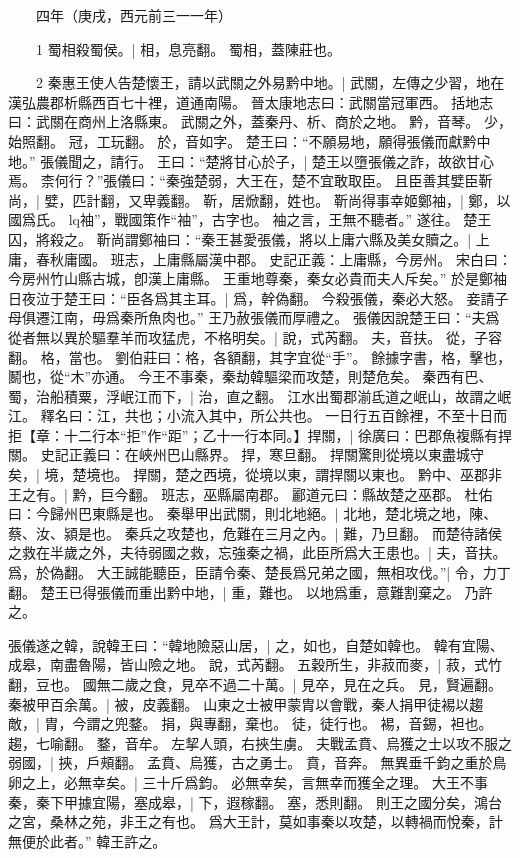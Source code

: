 　　四年（庚戌，西元前三一一年）

　　1 蜀相殺蜀侯。|{
	相，息亮翻。
	蜀相，蓋陳莊也。
}

　　2 秦惠王使人告楚懷王，請以武關之外易黔中地。|{
	武關，左傳之少習，地在漢弘農郡析縣西百七十裡，道通南陽。
	晉太康地志曰：武關當冠軍西。
	括地志曰：武關在商州上洛縣東。
	武關之外，蓋秦丹、析、商於之地。
	黔，音琴。
	少，始照翻。
	冠，工玩翻。
	於，音如字。
}
楚王曰：“不願易地，願得張儀而獻黔中地。”
張儀聞之，請行。
王曰：“楚將甘心於子，|{
	楚王以墮張儀之詐，故欲甘心焉。
}
柰何行？”張儀曰：“秦強楚弱，大王在，楚不宜敢取臣。
	且臣善其嬖臣靳尚，|{
	嬖，匹計翻，又卑義翻。
	靳，居焮翻，姓也。
}
靳尚得事幸姬鄭袖，|{
	鄭，以國爲氏。
	lq袖”，戰國策作“袖”，古字也。
}
袖之言，王無不聽者。”
遂往。
楚王囚，將殺之。
靳尚謂鄭袖曰：“秦王甚愛張儀，將以上庸六縣及美女贖之。|{
	上庸，春秋庸國。
	班志，上庸縣屬漢中郡。
	史記正義：上庸縣，今房州。
	宋白曰：今房州竹山縣古城，卽漢上庸縣。
}
王重地尊秦，秦女必貴而夫人斥矣。”
於是鄭袖日夜泣于楚王曰：“臣各爲其主耳。|{
	爲，幹偽翻。
}
今殺張儀，秦必大怒。
	妾請子母俱遷江南，毋爲秦所魚肉也。”
	王乃赦張儀而厚禮之。
	張儀因說楚王曰：“夫爲從者無以異於驅羣羊而攻猛虎，不格明矣。|{
	說，式芮翻。
	夫，音扶。
	從，子容翻。
	格，當也。
	劉伯莊曰：格，各額翻，其字宜從“手”。
	餘據字書，格，擊也，鬭也，從“木”亦通。
}
今王不事秦，秦劫韓驅梁而攻楚，則楚危矣。
秦西有巴、蜀，治船積粟，浮岷江而下，|{
	治，直之翻。
	江水出蜀郡湔氐道之岷山，故謂之岷江。
	釋名曰：江，共也；小流入其中，所公共也。
}
一日行五百餘裡，不至十日而拒【章：十二行本“拒”作“距”；乙十一行本同。】捍關，|{
	徐廣曰：巴郡魚複縣有捍關。
	史記正義曰：在峽州巴山縣界。
	捍，寒旦翻。
}
捍關驚則從境以東盡城守矣，|{
	境，楚境也。
	捍關，楚之西境，從境以東，謂捍關以東也。
}
黔中、巫郡非王之有。|{
	黔，巨今翻。
	班志，巫縣屬南郡。
	酈道元曰：縣故楚之巫郡。
	杜佑曰：今歸州巴東縣是也。
}
秦舉甲出武關，則北地絕。|{
	北地，楚北境之地，陳、蔡、汝、潁是也。
}
秦兵之攻楚也，危難在三月之內。|{
	難，乃旦翻。
}
而楚待諸侯之救在半歲之外，夫待弱國之救，忘強秦之禍，此臣所爲大王患也。|{
	夫，音扶。
	爲，於偽翻。
}
大王誠能聽臣，臣請令秦、楚長爲兄弟之國，無相攻伐。”|{
	令，力丁翻。
}
楚王已得張儀而重出黔中地，|{
	重，難也。
	以地爲重，意難割棄之。
}
乃許之。


張儀遂之韓，說韓王曰：“韓地險惡山居，|{
	之，如也，自楚如韓也。
	韓有宜陽、成皋，南盡魯陽，皆山險之地。
	說，式芮翻。
}
五穀所生，非菽而麥，|{
	菽，式竹翻，豆也。
}
國無二歲之食，見卒不過二十萬。|{
	見卒，見在之兵。
	見，賢遍翻。
}
秦被甲百余萬。|{
	被，皮義翻。
}
山東之士被甲蒙胄以會戰，秦人捐甲徒裼以趨敵，|{
	胄，今謂之兜鍪。
	捐，與專翻，棄也。
	徒，徒行也。
	裼，音錫，袒也。
	趨，七喻翻。
	鍪，音牟。
}
左挈人頭，右挾生虜。
	夫戰孟賁、烏獲之士以攻不服之弱國，|{
	挾，戶頰翻。
	孟賁、烏獲，古之勇士。
	賁，音奔。
}
無異垂千鈞之重於鳥卵之上，必無幸矣。|{
	三十斤爲鈞。
	必無幸矣，言無幸而獲全之理。
}
大王不事秦，秦下甲據宜陽，塞成皋，|{
	下，遐稼翻。
	塞，悉則翻。
}
則王之國分矣，鴻台之宮，桑林之苑，非王之有也。
爲大王計，莫如事秦以攻楚，以轉禍而悅秦，計無便於此者。”
韓王許之。


